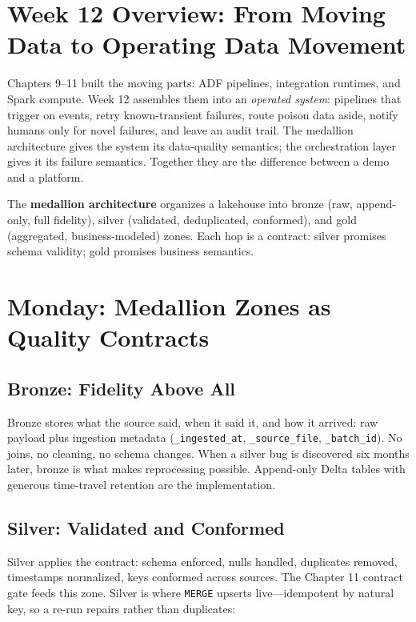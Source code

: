 \section{Week 12 Overview: From Moving Data to Operating Data Movement}
Chapters 9--11 built the moving parts: ADF pipelines, integration runtimes, and Spark compute. Week 12 assembles them into an \emph{operated system}: pipelines that trigger on events, retry known-transient failures, route poison data aside, notify humans only for novel failures, and leave an audit trail. The medallion architecture gives the system its data-quality semantics; the orchestration layer gives it its failure semantics. Together they are the difference between a demo and a platform.

\begin{definitionbox}
The \textbf{medallion architecture} organizes a lakehouse into bronze (raw, append-only, full fidelity), silver (validated, deduplicated, conformed), and gold (aggregated, business-modeled) zones. Each hop is a contract: silver promises schema validity; gold promises business semantics.
\end{definitionbox}

\section{Monday: Medallion Zones as Quality Contracts}

\subsection{Bronze: Fidelity Above All}
Bronze stores what the source said, when it said it, and how it arrived: raw payload plus ingestion metadata (\texttt{\_ingested\_at}, \texttt{\_source\_file}, \texttt{\_batch\_id}). No joins, no cleaning, no schema changes. When a silver bug is discovered six months later, bronze is what makes reprocessing possible. Append-only Delta tables with generous time-travel retention are the implementation.

\subsection{Silver: Validated and Conformed}
Silver applies the contract: schema enforced, nulls handled, duplicates removed, timestamps normalized, keys conformed across sources. The Chapter 11 contract gate feeds this zone. Silver is where \texttt{MERGE} upserts live---idempotent by natural key, so a re-run repairs rather than duplicates:

